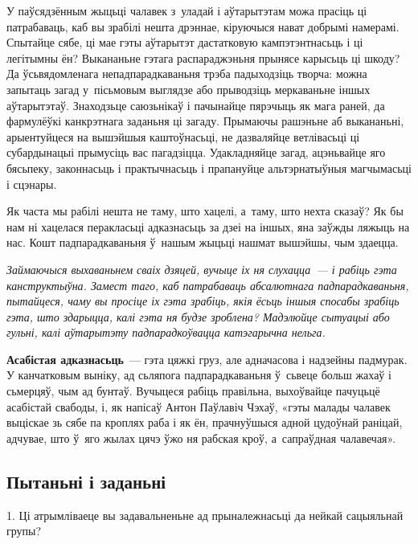 У паўсядзённым жыцьці чалавек з~уладай і аўтарытэтам можа прасіць ці патрабаваць, каб вы зрабілі нешта дрэннае, кіруючыся нават добрымі намерамі. Спытайце сябе, ці мае гэты аўтарытэт дастатковую кампэтэнтнасьць і ці легітымны ён? Выкананьне гэтага распараджэньня прынясе карысьць ці шкоду? Да ўсьвядомленага непадпарадкаваньня трэба падыходзіць творча: можна запытаць загад у~пісьмовым выглядзе або прыводзіць меркаваньне іншых аўтарытэтаў. Знаходзьце саюзьнікаў і пачынайце пярэчыць як мага раней, да фармулёўкі канкрэтнага заданьня ці загаду. Прымаючы рашэньне аб выкананьні, арыентуйцеся на вышэйшыя каштоўнасьці, не дазваляйце ветлівасьці ці субардынацыі прымусіць вас пагадзіцца. Удакладняйце загад, ацэньвайце яго бясьпеку, законнасьць і практычнасьць і прапануйце альтэрнатыўныя магчымасьці і сцэнары.


Як часта мы рабілі нешта не таму, што хацелі, а~таму, што нехта сказаў? Як бы нам ні хацелася перакласьці адказнасьць за дзеі на іншых, яна заўжды ляжыць на нас. Кошт падпарадкаваньня ў~нашым жыцьці нашмат вышэйшы, чым здаецца.

\emph{Займаючыся выхаваньнем сваіх дзяцей, вучыце іх ня слухацца~--- і рабіць гэта канструктыўна. Замест таго, каб патрабаваць абсалютнага падпарадкаваньня, пытайцеся, чаму вы просіце іх гэта зрабіць, якія ёсьць іншыя спосабы зрабіць гэта, што здарыцца, калі гэта ня будзе зроблена? Мадэлюйце сытуацыі або гульні, калі аўтарытэту падпарадкоўвацца катэгарычна нельга.} 

\textbf{Асабістая адказнасьць}~--- гэта цяжкі груз, але адначасова і надзейны падмурак. У канчатковым выніку, ад сьляпога падпарадкаваньня ў~сьвеце больш жахаў і сьмерцяў, чым ад бунтаў. Вучыцеся рабіць правільна, выхоўвайце пачуцьцё асабістай свабоды, і, як напісаў Антон Паўлавіч Чэхаў, «гэты малады чалавек выціскае зь сябе па кроплях раба і як ён, прачнуўшыся адной цудоўнай раніцай, адчувае, што ў~яго жылах цячэ ўжо ня рабская кроў, а~сапраўдная чалавечая».

\subsection*{Пытаньні і заданьні}

1. Ці атрымліваеце вы задавальненьне ад прыналежнасьці да нейкай сацыяльнай групы?

